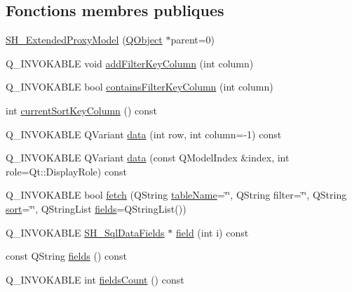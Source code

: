 \subsection*{Fonctions membres publiques}
\begin{DoxyCompactItemize}
\item 
\hyperlink{classSH__ExtendedProxyModel_a63b0969a9f5799c9e871e6ceb13cf83e}{S\-H\-\_\-\-Extended\-Proxy\-Model} (\hyperlink{classQObject}{Q\-Object} $\ast$parent=0)
\item 
Q\-\_\-\-I\-N\-V\-O\-K\-A\-B\-L\-E void \hyperlink{classSH__ExtendedProxyModel_a7b432fac5c42bf84a005f2942896ca32}{add\-Filter\-Key\-Column} (int column)
\item 
Q\-\_\-\-I\-N\-V\-O\-K\-A\-B\-L\-E bool \hyperlink{classSH__ExtendedProxyModel_a81c40d3ce9710029cae19cc65bf5419d}{contains\-Filter\-Key\-Column} (int column)
\item 
int \hyperlink{classSH__ExtendedProxyModel_adbbc1e62c72991f4ed14537cf1ba9c8f}{current\-Sort\-Key\-Column} () const 
\item 
Q\-\_\-\-I\-N\-V\-O\-K\-A\-B\-L\-E Q\-Variant \hyperlink{classSH__ExtendedProxyModel_a9fd2e16750c7c8c4cbd8f357b00ed008}{data} (int row, int column=-\/1) const 
\item 
Q\-\_\-\-I\-N\-V\-O\-K\-A\-B\-L\-E Q\-Variant \hyperlink{classSH__ExtendedProxyModel_afbc947efbe1107fc5bf8926c52902a1c}{data} (const Q\-Model\-Index \&index, int role=Qt\-::\-Display\-Role) const 
\item 
Q\-\_\-\-I\-N\-V\-O\-K\-A\-B\-L\-E bool \hyperlink{classSH__ExtendedProxyModel_a1df5323af8d29e81f22a7118227eeeb8}{fetch} (Q\-String \hyperlink{classSH__ExtendedProxyModel_abb133e196ca7cf90b9c9b57263e898d6}{table\-Name}=\char`\"{}\char`\"{}, Q\-String filter=\char`\"{}\char`\"{}, Q\-String \hyperlink{classSH__ExtendedProxyModel_a2d5fdb58bf67879e3f3130619b93104a}{sort}=\char`\"{}\char`\"{}, Q\-String\-List \hyperlink{classSH__ExtendedProxyModel_a3a69386b6070dacf320ef29e760816c1}{fields}=Q\-String\-List())
\item 
Q\-\_\-\-I\-N\-V\-O\-K\-A\-B\-L\-E \hyperlink{classSH__SqlDataFields}{S\-H\-\_\-\-Sql\-Data\-Fields} $\ast$ \hyperlink{classSH__ExtendedProxyModel_a75081819198741a532eefd5875a90678}{field} (int i) const 
\item 
const Q\-String \hyperlink{classSH__ExtendedProxyModel_a3a69386b6070dacf320ef29e760816c1}{fields} () const 
\item 
Q\-\_\-\-I\-N\-V\-O\-K\-A\-B\-L\-E int \hyperlink{classSH__ExtendedProxyModel_ab935cb0865fd2010ab35f1743adb8633}{fields\-Count} () const 

\end{DoxyCompactItemize}
